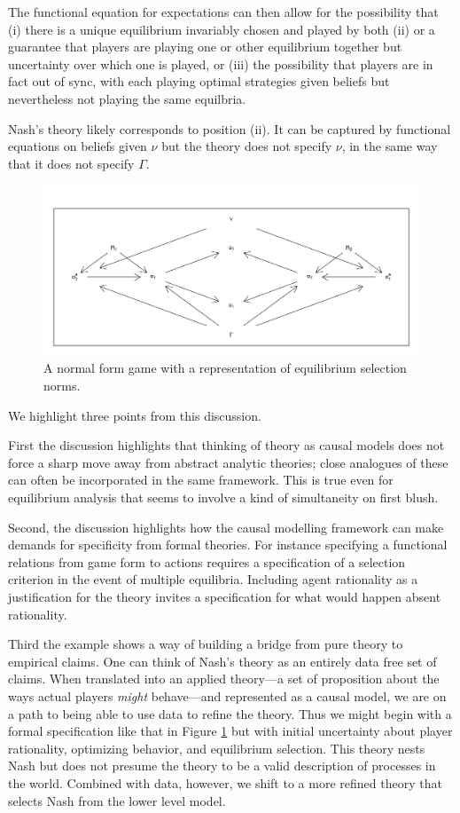 \documentclass[
  12pt,
]{book}
\begin{document}
The functional equation for expectations can then allow for the possibility that (i) there is a unique equilibrium invariably chosen and played by both (ii) or a guarantee that players are playing one or other equilibrium together but uncertainty over which one is played, or (iii) the possibility that players are in fact out of sync, with each playing optimal strategies given beliefs but nevertheless not playing the same equilbria.

Nash's theory likely corresponds to position (ii). It can be captured by functional equations on beliefs given \(\nu\) but the theory does not specify \(\nu\), in the same way that it does not specify \(\Gamma\).

\begin{figure}

{\centering \includegraphics[width=0.8\linewidth]{ii_files/figure-latex/nfg5-1} 

}

\caption{A normal form game with a representation of equilibrium selection norms.}\label{fig:nfg5}
\end{figure}

We highlight three points from this discussion.

First the discussion highlights that thinking of theory as causal models does not force a sharp move away from abstract analytic theories; close analogues of these can often be incorporated in the same framework. This is true even for equilibrium analysis that seems to involve a kind of simultaneity on first blush.

Second, the discussion highlights how the causal modelling framework can make demands for specificity from formal theories. For instance specifying a functional relations from game form to actions requires a specification of a selection criterion in the event of multiple equilibria. Including agent rationality as a justification for the theory invites a specification for what would happen absent rationality.

Third the example shows a way of building a bridge from pure theory to empirical claims. One can think of Nash's theory as an entirely data free set of claims. When translated into an applied theory---a set of proposition about the ways actual players \emph{might} behave---and represented as a causal model, we are on a path to being able to use data to refine the theory. Thus we might begin with a formal specification like that in Figure \ref{fig:nfg5} but with initial uncertainty about player rationality, optimizing behavior, and equilibrium selection. This theory nests Nash but does not presume the theory to be a valid description of processes in the world. Combined with data, however, we shift to a more refined theory that selects Nash from the lower level model.
\end{document}
